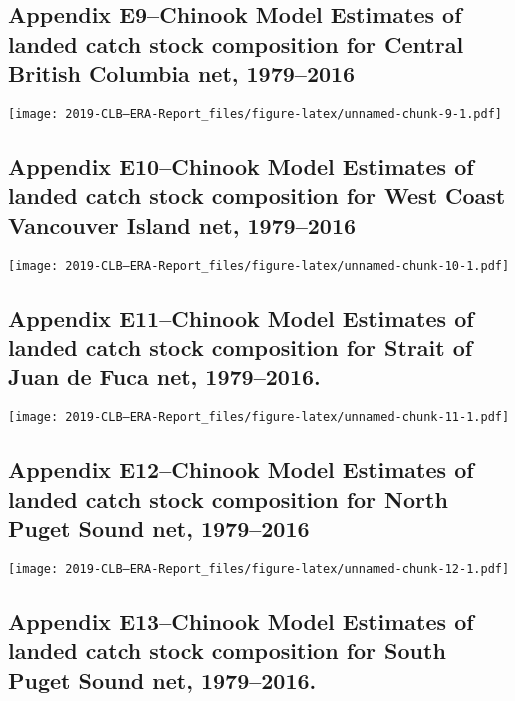 \documentclass[]{article}
\begin{document}
\newpage

\subsection{Appendix E9--Chinook Model Estimates of landed catch stock
composition for Central British Columbia net,
1979--2016}\label{appendix-e9chinook-model-estimates-of-landed-catch-stock-composition-for-central-british-columbia-net-19792016}

\texttt{[image: 2019-CLB---ERA-Report\_files/figure-latex/unnamed-chunk-9-1.pdf]}

\newpage

\subsection{Appendix E10--Chinook Model Estimates of landed catch stock
composition for West Coast Vancouver Island net,
1979--2016}\label{appendix-e10chinook-model-estimates-of-landed-catch-stock-composition-for-west-coast-vancouver-island-net-19792016}

\texttt{[image: 2019-CLB---ERA-Report\_files/figure-latex/unnamed-chunk-10-1.pdf]}

\newpage

\subsection{Appendix E11--Chinook Model Estimates of landed catch stock
composition for Strait of Juan de Fuca net,
1979--2016.}\label{appendix-e11chinook-model-estimates-of-landed-catch-stock-composition-for-strait-of-juan-de-fuca-net-19792016.}

\texttt{[image: 2019-CLB---ERA-Report\_files/figure-latex/unnamed-chunk-11-1.pdf]}

\newpage

\subsection{Appendix E12--Chinook Model Estimates of landed catch stock
composition for North Puget Sound net,
1979--2016}\label{appendix-e12chinook-model-estimates-of-landed-catch-stock-composition-for-north-puget-sound-net-19792016}

\texttt{[image: 2019-CLB---ERA-Report\_files/figure-latex/unnamed-chunk-12-1.pdf]}

\newpage

\subsection{Appendix E13--Chinook Model Estimates of landed catch stock
composition for South Puget Sound net,
1979--2016.}\label{appendix-e13chinook-model-estimates-of-landed-catch-stock-composition-for-south-puget-sound-net-19792016.}
\end{document}
